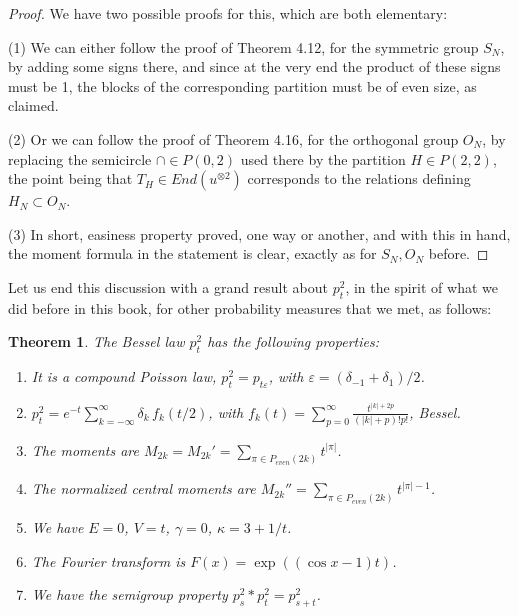 \documentclass[12pt]{amsbook}
\newtheorem{theorem}{Theorem}[chapter]
\begin{document}
\begin{proof}
We have two possible proofs for this, which are both elementary:

\medskip

(1) We can either follow the proof of Theorem 4.12, for the symmetric group $S_N$, by adding some signs there, and since at the very end the product of these signs must be 1, the blocks of the corresponding partition must be of even size, as claimed.

\medskip

(2) Or we can follow the proof of Theorem 4.16, for the orthogonal group $O_N$, by replacing the semicircle $\cap\in P(0,2)$ used there by the partition $H\in P(2,2)$, the point being that $T_H\in End(u^{\otimes 2})$ corresponds to the relations defining $H_N\subset O_N$.

\medskip

(3) In short, easiness property proved, one way or another, and with this in hand, the moment formula in the statement is clear, exactly as for $S_N,O_N$ before.
\end{proof}

Let us end this discussion with a grand result about $p^2_t$, in the spirit of what we did before in this book, for other probability measures that we met, as follows:

\begin{theorem}
The Bessel law $p^2_t$ has the following properties:
\begin{enumerate}
\item It is a compound Poisson law, $p^2_t=p_{t\varepsilon}$, with $\varepsilon=(\delta_{-1}+\delta_1)/2$.

\item $p^2_t=e^{-t}\sum_{k=-\infty}^\infty\delta_k\,f_k(t/2)$, with 
$f_k(t)=\sum_{p=0}^\infty \frac{t^{|k|+2p}}{(|k|+p)!p!}$, Bessel.

\item The moments are $M_{2k}=M_{2k}'=\sum_{\pi\in P_{even}(2k)}t^{|\pi|}$.

\item The normalized central moments are $M_{2k}''=\sum_{\pi\in P_{even}(2k)}t^{|\pi|-1}$.

\item We have $E=0$, $V=t$, $\gamma=0$, $\kappa=3+1/t$.

\item The Fourier transform is $F(x)=\exp((\cos x-1)t)$.

\item We have the semigroup property $p^2_s*p^2_t=p^2_{s+t}$.
\end{enumerate}
\end{theorem}
\end{document}
